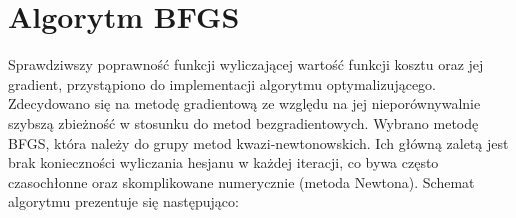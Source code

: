 \section{Algorytm BFGS}
\label{sec:bfgs}

Sprawdziwszy poprawność funkcji wyliczającej wartość funkcji kosztu oraz jej gradient, przystąpiono do  implementacji algorytmu optymalizującego. Zdecydowano się na metodę gradientową ze względu na jej nieporównywalnie szybszą zbieżność w stosunku do metod bezgradientowych. Wybrano metodę BFGS, która należy do grupy metod kwazi-newtonowskich. Ich główną zaletą jest brak konieczności wyliczania hesjanu w każdej iteracji, co bywa często czasochłonne oraz skomplikowane numerycznie (metoda Newtona). Schemat algorytmu prezentuje się następująco:

